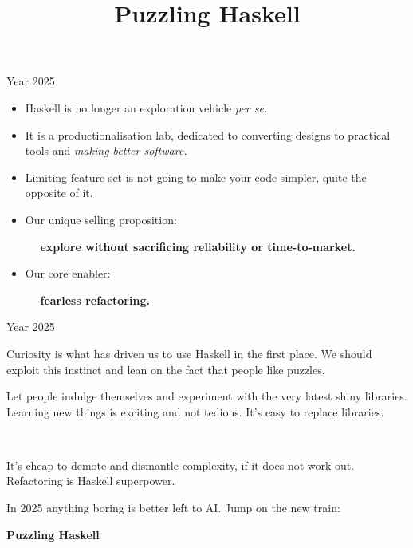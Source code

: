 \documentclass[handout]{beamer}
\begin{document}
\boring
\simple
\boring

\begin{frame}{Year 2025}

\begin{itemize}[<+->]\itemsep3ex
\item Haskell is no longer an exploration vehicle {\it per se.}
\item It is a productionalisation lab, dedicated to
      converting designs to practical tools
      and {\it making better software.}
\item Limiting feature set is not going to make your code simpler,
      quite the opposite of it.
\item Our unique selling proposition: \par ~~ {\bf explore without sacrificing reliability or time-to-market.}
\item Our core enabler: \par ~~ {\bf fearless refactoring.}
\end{itemize}

\end{frame}

\simple

\begin{frame}{Year 2025}

\begin{description}[<+->]
\item[Accessibility]
Curiosity is what has driven us to use Haskell in the first place.
We should exploit this instinct and lean on the fact that people
like puzzles.
\item[Maturity]
Let people indulge themselves and experiment with the very latest shiny libraries.
Learning new things is exciting and not tedious. It's easy to replace libraries.
\item[Leaking Complexity] ~ \par
It's cheap to demote and dismantle complexity, if it does not work out.
Refactoring is Haskell superpower.
\end{description}

\bigskip
\pause

In 2025 anything boring is better left to AI.
Jump on the new train:

\bigskip

\centerline{\bf\Large Puzzling Haskell}

\end{frame}

\title{Puzzling Haskell}
\end{document}
